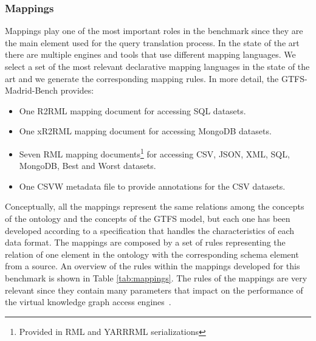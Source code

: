 \subsubsection{Mappings} 
Mappings play one of the most important roles in the benchmark since they are the main element used for the query translation process. In the state of the art there are multiple engines and tools that use different mapping languages. We select a set of the most relevant declarative mapping languages in the state of the art and we generate the corresponding mapping rules. In more detail, the GTFS-Madrid-Bench provides:
\begin{itemize}
    \item One R2RML mapping document for accessing SQL datasets.
    \item One xR2RML mapping document for accessing MongoDB datasets.
    \item Seven RML mapping documents\footnote{Provided in RML and YARRRML serializations} for accessing CSV, JSON, XML, SQL, MongoDB, Best and Worst datasets.
    \item One CSVW metadata file to provide annotations for the CSV datasets.
\end{itemize}
Conceptually, all the mappings represent the same relations among the concepts of the ontology and the concepts of the GTFS model, but each one has been developed according to a specification that handles the characteristics of each data format. The mappings are composed by a set of rules representing the relation of one element in the ontology with the corresponding schema element from a source. An overview of the rules within the mappings developed for this benchmark is shown in Table \ref{tab:mappings}. The rules of the mappings are very relevant since they contain many parameters that impact on the performance of the virtual knowledge graph access engines~\citep{chaves2019what}. 

